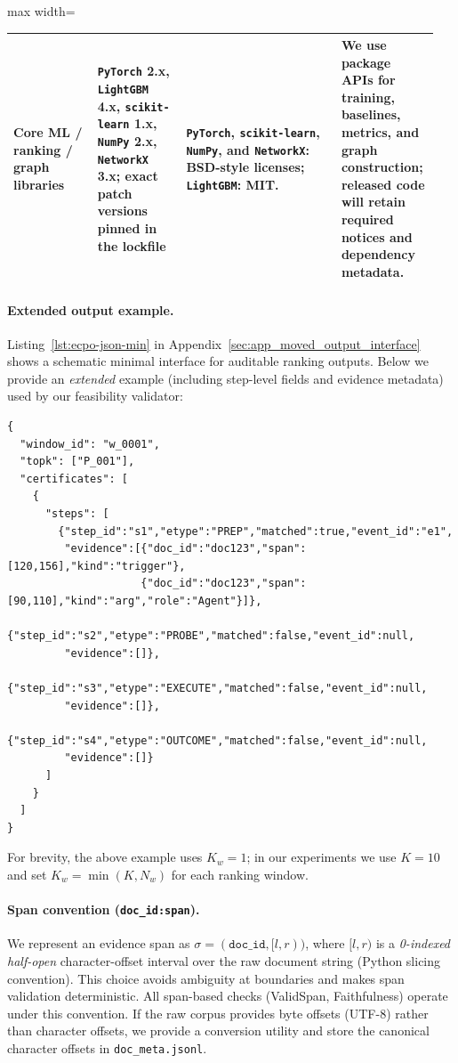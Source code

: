 \documentclass{article}
\begin{document}
\begin{table}[ht]
\begin{adjustbox}{max width=\linewidth}
\begin{tabular}{p{0.19\linewidth}p{0.20\linewidth}p{0.35\linewidth}p{0.21\linewidth}}
Core ML / ranking / graph libraries & \texttt{PyTorch} 2.x, \texttt{LightGBM} 4.x, \texttt{scikit-learn} 1.x, \texttt{NumPy} 2.x, \texttt{NetworkX} 3.x; exact patch versions pinned in the lockfile & \texttt{PyTorch}, \texttt{scikit-learn}, \texttt{NumPy}, and \texttt{NetworkX}: BSD-style licenses; \texttt{LightGBM}: MIT. & We use package APIs for training, baselines, metrics, and graph construction; released code will retain required notices and dependency metadata. \\
\hline
\end{tabular}
\end{adjustbox}
\end{table}

\paragraph{Extended output example.}
Listing~\ref{lst:ecpo-json-min} in Appendix~\ref{sec:app_moved_output_interface} shows a schematic minimal interface for auditable ranking outputs.
Below we provide an \emph{extended} example (including step-level fields and evidence metadata) used by our feasibility validator:
\begin{lstlisting}[caption={Extended example of ECPO output schema (JSON).},label={lst:ecpo-json-example}]
{
  "window_id": "w_0001",
  "topk": ["P_001"],
  "certificates": [
    {
      "steps": [
        {"step_id":"s1","etype":"PREP","matched":true,"event_id":"e1",
         "evidence":[{"doc_id":"doc123","span":[120,156],"kind":"trigger"},
                     {"doc_id":"doc123","span":[90,110],"kind":"arg","role":"Agent"}]},
        {"step_id":"s2","etype":"PROBE","matched":false,"event_id":null,
         "evidence":[]},
        {"step_id":"s3","etype":"EXECUTE","matched":false,"event_id":null,
         "evidence":[]},
        {"step_id":"s4","etype":"OUTCOME","matched":false,"event_id":null,
         "evidence":[]}
      ]
    }
  ]
}
\end{lstlisting}

For brevity, the above example uses $K_w{=}1$; in our experiments we use $K{=}10$ and set $K_w=\min(K,N_w)$ for each ranking window.

\paragraph{Span convention (\texttt{doc\_id:span}).}
We represent an evidence span as $\sigma=(\texttt{doc\_id},[l,r))$, where $[l,r)$ is a \emph{0-indexed half-open} character-offset interval over the raw document string (Python slicing convention).
This choice avoids ambiguity at boundaries and makes span validation deterministic.
All span-based checks (ValidSpan, Faithfulness) operate under this convention.
If the raw corpus provides byte offsets (UTF-8) rather than character offsets, we provide a conversion utility and store the canonical character offsets in \texttt{doc\_meta.jsonl}.
\end{document}
